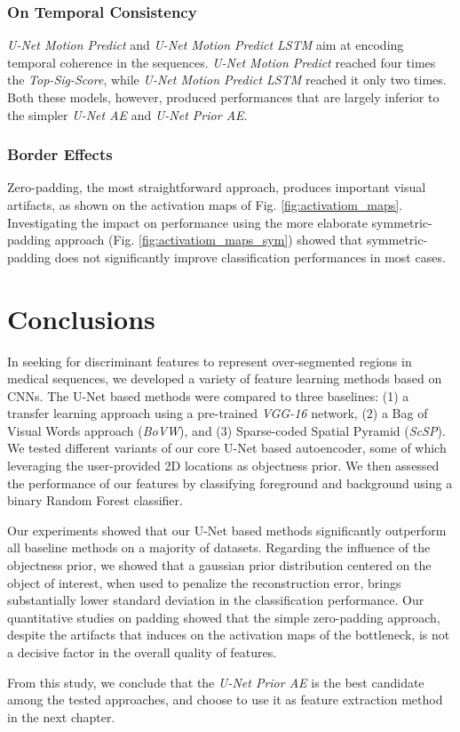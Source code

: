 \subsubsection{On Temporal Consistency}
\textit{U-Net Motion Predict} and \textit{U-Net Motion Predict LSTM} aim at encoding temporal coherence in the sequences.
\textit{U-Net Motion Predict} reached four times the \textit{Top-Sig-Score}, while \textit{U-Net Motion Predict LSTM} reached it only two times.
Both these models, however, produced performances that are largely inferior to the simpler \textit{U-Net AE} and \textit{U-Net Prior AE}.

\subsubsection{Border Effects}
Zero-padding, the most straightforward approach, produces important visual artifacts, as shown on the activation maps of Fig. \ref{fig:activatiom_maps}.
Investigating the impact on performance using the more elaborate symmetric-padding approach (Fig. \ref{fig:activatiom_maps_sym}) showed that symmetric-padding does not significantly improve classification performances in most cases.

\section{Conclusions}
In seeking for discriminant features to represent over-segmented regions in medical sequences, we developed a variety of feature learning methods based on CNNs.
The U-Net based methods were compared to three baselines: (1) a transfer learning approach using a pre-trained \textit{VGG-16} network, (2) a Bag of Visual Words approach (\textit{BoVW}), and (3) Sparse-coded Spatial Pyramid (\textit{ScSP}).
We tested different variants of our core U-Net based autoencoder, some of which leveraging the user-provided 2D locations as objectness prior.
We then assessed the performance of our features by classifying foreground and background using a binary Random Forest classifier.

Our experiments showed that our U-Net based methods significantly outperform all baseline methods on a majority of datasets.
Regarding the influence of the objectness prior, we showed that a gaussian prior distribution centered on the object of interest, when used to penalize the reconstruction error, brings substantially lower standard deviation in the  classification performance.
Our quantitative studies on padding showed that the simple zero-padding approach, despite the artifacts that induces on the activation maps of the bottleneck, is not a decisive factor in the overall quality of features.

From this study, we conclude that the \textit{U-Net Prior AE} is the best candidate among the tested approaches, and choose to use it as feature extraction method in the next chapter.

